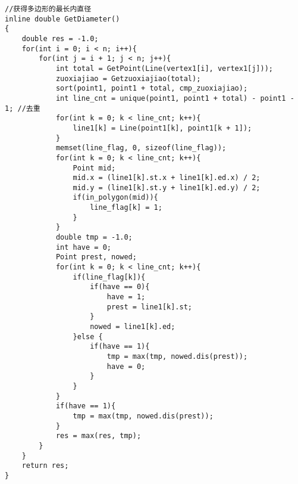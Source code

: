 \begin{lstlisting}
//获得多边形的最长内直径
inline double GetDiameter()
{
    double res = -1.0;
    for(int i = 0; i < n; i++){
        for(int j = i + 1; j < n; j++){
            int total = GetPoint(Line(vertex1[i], vertex1[j]));
            zuoxiajiao = Getzuoxiajiao(total);
            sort(point1, point1 + total, cmp_zuoxiajiao);
            int line_cnt = unique(point1, point1 + total) - point1 - 1; //去重
            for(int k = 0; k < line_cnt; k++){
                line1[k] = Line(point1[k], point1[k + 1]);
            }
            memset(line_flag, 0, sizeof(line_flag));
            for(int k = 0; k < line_cnt; k++){
                Point mid;
                mid.x = (line1[k].st.x + line1[k].ed.x) / 2;
                mid.y = (line1[k].st.y + line1[k].ed.y) / 2;
                if(in_polygon(mid)){
                    line_flag[k] = 1;
                }
            }
            double tmp = -1.0;
            int have = 0;
            Point prest, nowed;
            for(int k = 0; k < line_cnt; k++){
                if(line_flag[k]){
                    if(have == 0){
                        have = 1;
                        prest = line1[k].st;
                    }
                    nowed = line1[k].ed;
                }else {
                    if(have == 1){
                        tmp = max(tmp, nowed.dis(prest));
                        have = 0;
                    }
                }
            }
            if(have == 1){
                tmp = max(tmp, nowed.dis(prest));
            }
            res = max(res, tmp);
        }
    }
    return res;
}
\end{lstlisting}


%
